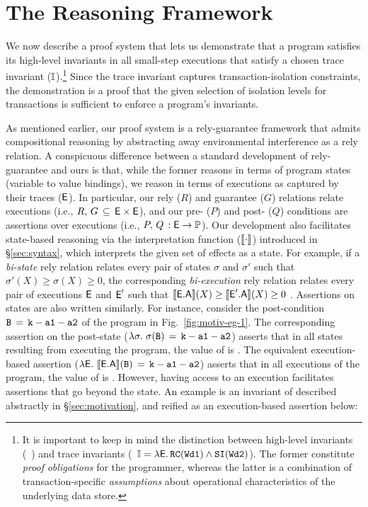 \section{The Reasoning Framework}
\label{sec:reasoning}

We now describe a proof system that lets us demonstrate that a \txnimp
program satisfies its high-level invariants in all small-step
executions that satisfy a chosen trace invariant ($\mathbb{I}$).\footnote{It is
important to keep in mind the distinction between high-level invariants
(\eg~) and trace invariants (\eg~$\mathbb{I} =
\lambda\textsf{E}.\,{\tt RC}({\tt Wd1})\wedge {\tt SI}({\tt Wd2})$). The former
constitute \emph{proof} \emph{obligations} for the programmer, whereas
the latter is a combination of transaction-specific \emph{assumptions} about 
operational characteristics of the underlying data store. } 
Since the trace invariant captures transaction-isolation constraints,
the demonstration is a proof that the given selection of isolation
levels for transactions is sufficient to enforce a program's invariants.

As mentioned earlier, our proof system is a rely-guarantee framework
that admits compositional reasoning by abstracting away environmental
interference as a rely relation. A conspicuous difference between a
standard development of rely-guarantee and ours is that, while the
former reasons in terms of program states (variable to value
bindings), we reason in terms of executions as captured by their
traces ($\textsf{E}$). In particular, our rely ($R$) and guarantee ($G$)
relations relate executions (i.e., $R,\,G\,\subseteq\,\textsf{E}\times\textsf{E}$),
and our pre- ($P$) and post- ($Q$) conditions are assertions over
executions (i.e., $P,\,Q\, : \textsf{E} \rightarrow \mathbb{P}$). Our development
also facilitates state-based reasoning via the interpretation function
($\llbracket \cdot \rrbracket$) introduced in \S\ref{sec:syntax}, which interprets
the given set of effects as a state. For example, if a \emph{bi-state}
rely relation relates every pair of states $\sigma$ and $\sigma'$ such
that $\sigma'(X) \ge \sigma(X) \ge 0$, the corresponding
\emph{bi-execution} rely relation relates every pair of executions
$\textsf{E}$ and $\textsf{E}'$ such that $\llbracket \textsf{E}.\textsf{A} \rrbracket(X) \ge \llbracket \textsf{E}'.\textsf{A} \rrbracket(X) \ge
0$ . Assertions on states are also written similarly. For instance,
consider the post-condition ${\tt B\,=\,k-a1-a2}$ of the program in
Fig.~\ref{fig:motiv-eg-1}. The corresponding assertion on the
post-state ($\lambda\sigma.~\sigma({\tt B}) \,=\, {\tt k-a1-a2}$) asserts
that in all states resulting from executing the program, the value of
 is . The equivalent execution-based assertion
($\lambda\textsf{E}.~\llbracket \textsf{E}.\textsf{A} \rrbracket({\tt B})\,=\,{\tt k-a1-a2}$) asserts that in
all executions of the program, the value of  is .
However, having access to an execution facilitates assertions that go
beyond the state. An example is an invariant of  described
abstractly in \S\ref{sec:motivation}, and reified as an
execution-based assertion below:

